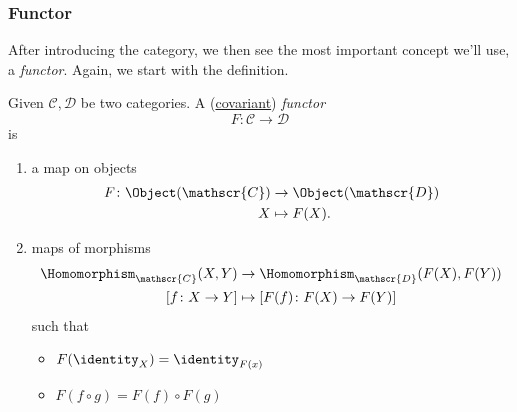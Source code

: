\subsubsection{Functor}
After introducing the category, we then see the most important concept we'll use, a \emph{functor}. Again, we start with the definition.
\begin{definition}[Functor]
	Given \(\mathscr{C} , \mathscr{D} \) be two categories. A (\underline{covariant}) \emph{functor}
	\[
		F\colon \mathscr{C} \to \mathscr{D}
	\]
	is
	\begin{enumerate}
		\item a map on objects
		      \[
			      \begin{split}
				      F\colon \Object(\mathscr{C} )&\to \Object(\mathscr{D} )\\
				      X&\mapsto F(X).
			      \end{split}
		      \]
		\item maps of morphisms
		      \[
			      \begin{split}
				      \Homomorphism_{\mathscr{C} }(X, Y)&\to \Homomorphism_{\mathscr{D} }(F(X), F(Y))\\
				      \left[f\colon X\to Y\right] &\mapsto \left[F(f)\colon F(X)\to F(Y)\right]
			      \end{split}
		      \]
		      such that
		      \begin{itemize}
			      \item \(F(\identity_{X} ) = \identity_{F(x)} \)
			      \item \(F(f\circ g) = F(f)\circ F(g)\)
		      \end{itemize}
	\end{enumerate}
\end{definition}